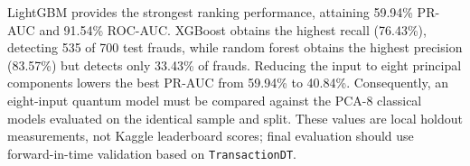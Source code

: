 LightGBM provides the strongest ranking performance, attaining 59.94\% PR-AUC and 91.54\% ROC-AUC. XGBoost obtains the highest recall (76.43\%), detecting 535 of 700 test frauds, while random forest obtains the highest precision (83.57\%) but detects only 33.43\% of frauds. Reducing the input to eight principal components lowers the best PR-AUC from 59.94\% to 40.84\%. Consequently, an eight-input quantum model must be compared against the PCA-8 classical models evaluated on the identical sample and split. These values are local holdout measurements, not Kaggle leaderboard scores; final evaluation should use forward-in-time validation based on \texttt{TransactionDT}.

